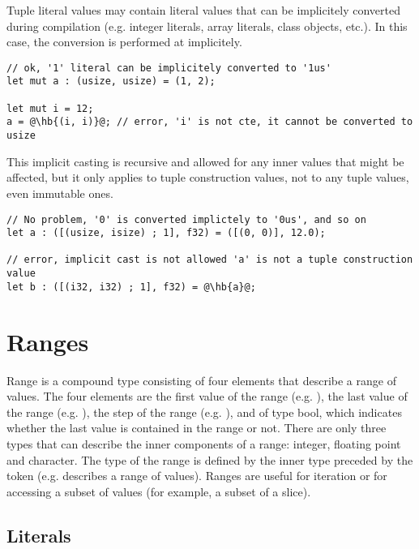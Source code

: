 Tuple literal values may contain literal values that can be implicitely
converted during compilation (e.g. integer literals, array literals, class
objects, etc.). In this case, the conversion is performed at 
implicitely.

\begin{lstlisting}[style=coloredverbatim, escapechar=@]
// ok, '1' literal can be implicitely converted to '1us'
let mut a : (usize, usize) = (1, 2);

let mut i = 12;
a = @\hb{(i, i)}@; // error, 'i' is not cte, it cannot be converted to usize
\end{lstlisting}

This implicit casting is recursive and allowed for any inner values that might
be affected, but it only applies to tuple construction values, not to any tuple
values, even immutable ones.

\begin{lstlisting}[style=coloredverbatim, escapechar=@]
// No problem, '0' is converted implictely to '0us', and so on
let a : ([(usize, isize) ; 1], f32) = ([(0, 0)], 12.0);

// error, implicit cast is not allowed 'a' is not a tuple construction value
let b : ([(i32, i32) ; 1], f32) = @\hb{a}@;
\end{lstlisting}

\vfill%
\pagebreak

\section {Ranges}%
\label{sec:range_type}

Range is a compound type consisting of four elements that describe a range of
values. The four elements are  the first value of the range (e.g.
),  the last value of the range (e.g. ),
 the step of the range (e.g. ), and  of
type bool, which indicates whether the last value  is contained in
the range or not. There are only three types that can describe the inner
components of a range: integer, floating point and character. The type of the
range is defined by the inner type preceded by the token  (e.g.
 describes a range of  values). Ranges are useful for
iteration or for accessing a subset of values (for example, a subset of a
slice).

\subsection {Literals}

